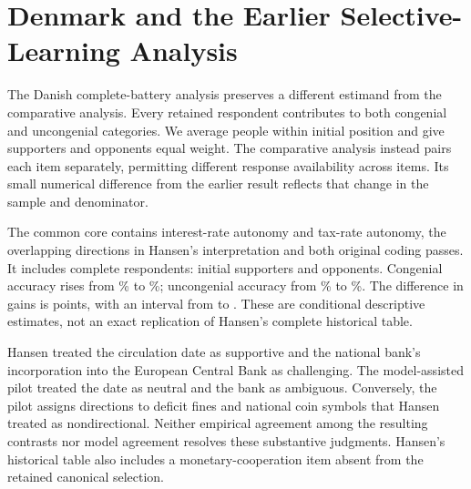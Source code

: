 \section{Denmark and the Earlier Selective-Learning Analysis}

The Danish complete-battery analysis preserves a different estimand from the comparative analysis. Every retained respondent contributes to both congenial and uncongenial categories. We average people within initial position and give supporters and opponents equal weight. The comparative analysis instead pairs each item separately, permitting different response availability across items. Its small numerical difference from the earlier result reflects that change in the sample and denominator.

The common core contains interest-rate autonomy and tax-rate autonomy, the overlapping directions in Hansen's interpretation and both original coding passes. It includes \nPaired{} complete respondents: \nSupport{} initial supporters and \nOppose{} opponents. Congenial accuracy rises from \corePreC\% to \corePostC\%; uncongenial accuracy from \corePreU\% to \corePostU\%. The difference in gains is \coreDiff{} points, with an interval from \coreLow{} to \coreHigh{}. These are conditional descriptive estimates, not an exact replication of Hansen's complete historical table.

\begin{table}[H]
\centering\small
\caption{Danish complete-battery sensitivity to item interpretation.}

\end{table}

Hansen treated the circulation date as supportive and the national bank's incorporation into the European Central Bank as challenging. The model-assisted pilot treated the date as neutral and the bank as ambiguous. Conversely, the pilot assigns directions to deficit fines and national coin symbols that Hansen treated as nondirectional. Neither empirical agreement among the resulting contrasts nor model agreement resolves these substantive judgments. Hansen's historical table also includes a monetary-cooperation item absent from the retained canonical selection.

